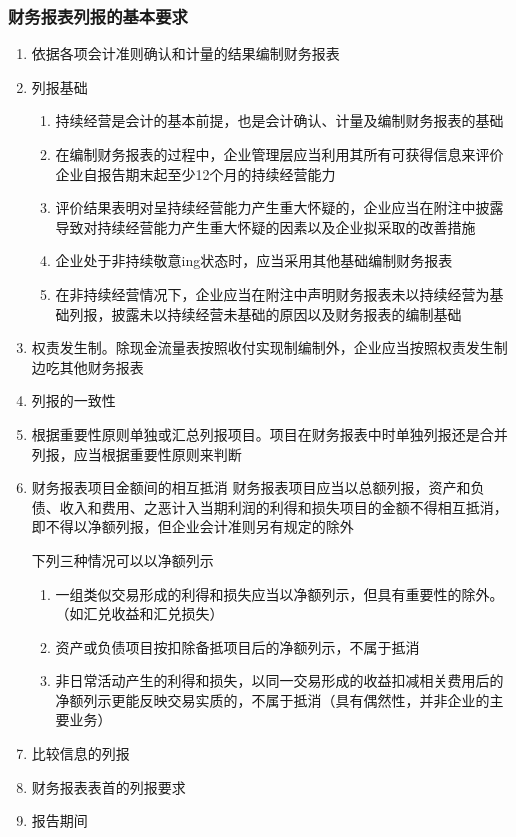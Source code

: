 \documentclass[UTF8,12pt]{ctexart}
\numberwithin{equation}{section} %
\numberwithin{figure}{section}
\numberwithin{table}{section}
\begin{document}
	\subsubsection{财务报表列报的基本要求}
	\begin{enumerate}
		\item 依据各项会计准则确认和计量的结果编制财务报表
		
		\item 列报基础
		\begin{enumerate}
			\item 持续经营是会计的基本前提，也是会计确认、计量及编制财务报表的基础
			
			\item 在编制财务报表的过程中，企业管理层应当利用其所有可获得信息来评价企业自报告期末起至少12个月的持续经营能力
			
			\item 评价结果表明对呈持续经营能力产生重大怀疑的，企业应当在附注中披露导致对持续经营能力产生重大怀疑的因素以及企业拟采取的改善措施
			
			\item 企业处于非持续敬意ing状态时，应当采用其他基础编制财务报表
			
			\item 在非持续经营情况下，企业应当在附注中声明财务报表未以持续经营为基础列报，披露未以持续经营未基础的原因以及财务报表的编制基础
		\end{enumerate}
		
		\item 权责发生制。除现金流量表按照收付实现制编制外，企业应当按照权责发生制边吃其他财务报表
		
		\item 列报的一致性
		
		\item 根据重要性原则单独或汇总列报项目。项目在财务报表中时单独列报还是合并列报，应当根据重要性原则来判断
		
		\item 财务报表项目金额间的相互抵消
		财务报表项目应当以总额列报，资产和负债、收入和费用、之恶计入当期利润的利得和损失项目的金额不得相互抵消，即不得以净额列报，但企业会计准则另有规定的除外
		
		下列三种情况可以以净额列示
		\begin{enumerate}
			\item 一组类似交易形成的利得和损失应当以净额列示，但具有重要性的除外。（如汇兑收益和汇兑损失）
			
			\item 资产或负债项目按扣除备抵项目后的净额列示，不属于抵消
			
			\item 非日常活动产生的利得和损失，以同一交易形成的收益扣减相关费用后的净额列示更能反映交易实质的，不属于抵消（具有偶然性，并非企业的主要业务）
		\end{enumerate}
		\item 比较信息的列报
		
		\item 财务报表表首的列报要求
		
		\item 报告期间
	\end{enumerate}
	
\end{document}
